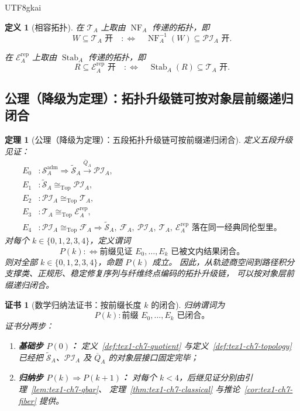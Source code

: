 \documentclass[12pt]{article}
\newtheorem{definition}{定义}[section]
\newtheorem{theorem}{定理}[section]
\newtheorem{Certificate}{证书}[section]
\begin{document}
\begin{CJK*}{UTF8}{gkai}
\begin{definition}[相容拓扑]
在 \(\mathcal T_A\) 上取由 \(\operatorname{NF}_A\) 传递的拓扑，即
\[
  W\subseteq \mathcal T_A \text{ 开}
  \quad:\Longleftrightarrow\quad
  \operatorname{NF}_A^{-1}(W)\subseteq \mathcal{PI}_A \text{ 开}.
\]

在 \(\mathcal E_A^{\mathrm{rep}}\) 上取由 \(\operatorname{Stab}_A\) 传递的拓扑，即
\[
  R\subseteq \mathcal E_A^{\mathrm{rep}} \text{ 开}
  \quad:\Longleftrightarrow\quad
  \operatorname{Stab}_A(R)\subseteq \mathcal T_A \text{ 开}.
\]
\end{definition}

\subsection{公理（降级为定理）：拓扑升级链可按对象层前缀递归闭合}
\label{subsec:tex1-ch7-axiom}

\begin{theorem}[公理（降级为定理）：五段拓扑升级链可按前缀递归闭合]
\label{thm:tex1-ch7-axiom-downgraded}
定义五段升级见证：
\[
\begin{aligned}
  E_0 &: \mathcal S_A^{\mathrm{adm}}
         \Longrightarrow
         \widetilde{\mathcal S}_A
         \xrightarrow{\overline Q_A}
         \mathcal{PI}_A,\\
  E_1 &: \widetilde{\mathcal S}_A\cong_{\mathrm{Top}}\mathcal{PI}_A,\\
  E_2 &: \mathcal{PI}_A\cong_{\mathrm{Top}}\mathcal T_A,\\
  E_3 &: \mathcal T_A\cong_{\mathrm{Top}}\mathcal E_A^{\mathrm{rep}},\\
  E_4 &: \mathcal{PI}_A\cong_{\mathrm{Top}}\mathcal F_A
         \Longrightarrow
         \widetilde{\mathcal S}_A,\ \mathcal F_A,\ \mathcal{PI}_A,\ \mathcal T_A,\ \mathcal E_A^{\mathrm{rep}}
         \text{ 落在同一经典同伦型里。}
\end{aligned}
\]
对每个 \(k\in\{0,1,2,3,4\}\)，定义谓词
\[
  P(k)
  :\Longleftrightarrow
  \text{前缀见证 }E_0,\dots,E_k\text{ 已被文内结果闭合。}
\]
则对全部 \(k\in\{0,1,2,3,4\}\)，命题 \(P(k)\) 成立。
因此，从轨迹商空间到路径积分支撑类、正规形、稳定修复序列与纤维终点编码的拓扑升级链，
可以按对象层前缀递归闭合。
\end{theorem}

\begin{Certificate}[数学归纳法证书：按前缀长度 \(k\) 的闭合]
\label{cert:tex1-ch7-axiom-downgraded}
归纳谓词为
\[
  P(k):
  \text{前缀 }E_0,\dots,E_k\text{ 已闭合。}
\]
证书分两步：
\begin{enumerate}
  \item \textbf{基础步 \(P(0)\)：}
  定义~\ref{def:tex1-ch7-quotient} 与定义~\ref{def:tex1-ch7-topology}
  已经把 \(\widetilde{\mathcal S}_A\)、\(\mathcal{PI}_A\) 及 \(\overline Q_A\) 的对象层接口固定完毕；
  \item \textbf{归纳步 \(P(k)\Rightarrow P(k+1)\)：}
  对每个 \(k<4\)，后继见证分别由引理~\ref{lem:tex1-ch7-qbar}、
  定理~\ref{thm:tex1-ch7-classical} 与推论~\ref{cor:tex1-ch7-fiber}
  提供。
\end{enumerate}
\end{Certificate}


\end{CJK*}
\end{document}

